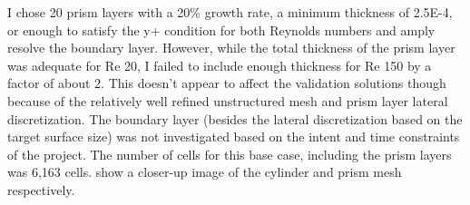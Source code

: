 \documentclass[10pt,english]{article}
\begin{document}
I chose 20 prism layers with a 20\% growth rate, a minimum thickness of 2.5E-4, or enough to satisfy the y+ condition for both Reynolds numbers and amply resolve the boundary layer.  However, while the total thickness of the prism layer was adequate for Re 20, I failed to include enough thickness for Re 150 by a factor of about 2.  This doesn't appear to affect the validation solutions though because of the relatively well refined unstructured mesh and prism layer lateral discretization.  The boundary layer (besides the lateral discretization based on the target surface size) was not investigated based on the intent and time constraints of the project.  The number of cells for this base case, including the prism layers was 6,163 cells.  show a closer-up image of the cylinder and prism mesh respectively.  
\end{document}
